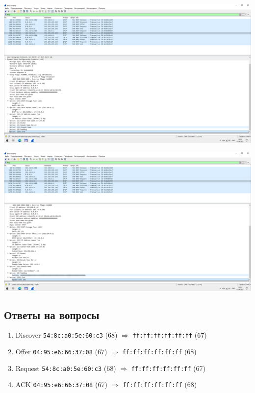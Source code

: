 \begin{center}
    \includegraphics[width=\textwidth]{screenshots/dhcp_ack2_1}

    \includegraphics[width=\textwidth]{screenshots/dhcp_ack2_2}

\end{center}

\subsection{Ответы на вопросы}

\begin{enumerate}
    \item Discover \texttt{54:8c:a0:5e:60:c3} (68) $\Longrightarrow$ \texttt{ff:ff:ff:ff:ff:ff} (67)
    \item Offer    \texttt{04:95:e6:66:37:08} (67) $\Longrightarrow$ \texttt{ff:ff:ff:ff:ff:ff} (68)
    \item Request  \texttt{54:8c:a0:5e:60:c3} (68) $\Longrightarrow$ \texttt{ff:ff:ff:ff:ff:ff} (67)
    \item ACK      \texttt{04:95:e6:66:37:08} (67) $\Longrightarrow$ \texttt{ff:ff:ff:ff:ff:ff} (68)
\end{enumerate}

